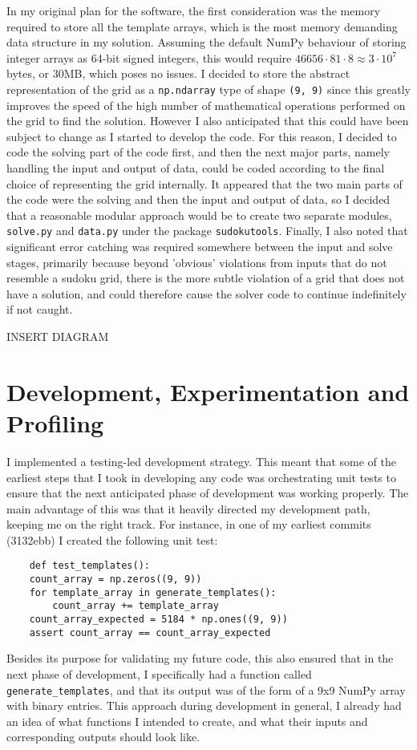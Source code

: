 \documentclass[12pt]{article}
\begin{document}
In my original plan for the software, the first consideration was the memory required to store all the template arrays, which is the most memory demanding data structure in my solution.
Assuming the default NumPy behaviour of storing integer arrays as 64-bit signed integers, this would require $46656\cdot81\cdot8\approx3\cdot10^7$ bytes, or 30MB, which poses no issues.
I decided to store the abstract representation of the grid as a \texttt{np.ndarray} type of shape \texttt{(9, 9)} since this greatly improves the speed of the high number of mathematical operations performed on the grid to find the solution.
However I also anticipated that this could have been subject to change as I started to develop the code.
For this reason, I decided to code the solving part of the code first, and then the next major parts, namely handling the input and output of data, could be coded according to the final choice of representing the grid internally.
It appeared that the two main parts of the code were the solving and then the input and output of data, so I decided that a reasonable modular approach would be to create two separate modules, \texttt{solve.py} and \texttt{data.py} under the package \texttt{sudokutools}.
Finally, I also noted that significant error catching was required somewhere between the input and solve stages, primarily because beyond 'obvious' violations from inputs that do not resemble a sudoku grid, there is the more subtle violation of a grid that does not have a solution, and could therefore cause the solver code to continue indefinitely if not caught.


INSERT DIAGRAM
\section*{Development, Experimentation and Profiling}
I implemented a testing-led development strategy.
This meant that some of the earliest steps that I took in developing any code was orchestrating unit tests to ensure that the next anticipated phase of development was working properly.
The main advantage of this was that it heavily directed my development path, keeping me on the right track.
For instance, in one of my earliest commits (3132ebb) I created the following unit test:

\begin{lstlisting}
    def test_templates():
    count_array = np.zeros((9, 9))
    for template_array in generate_templates():
        count_array += template_array
    count_array_expected = 5184 * np.ones((9, 9))
    assert count_array == count_array_expected
\end{lstlisting}
Besides its purpose for validating my future code, this also ensured that in the next phase of development, I specifically had a function called \texttt{generate\_templates}, and that its output was of the form of a 9x9 NumPy array with binary entries.
This approach during development in general, I already had an idea of what functions I intended to create, and what their inputs and corresponding outputs should look like.
\end{document}
